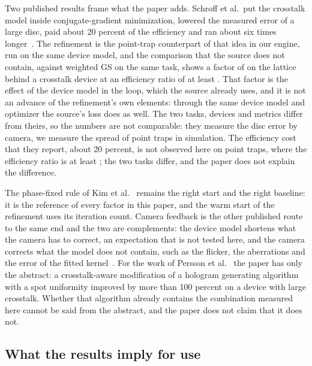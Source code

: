 Two published results frame what the paper adds. Schroff et al.\ put the crosstalk model inside conjugate-gradient minimization, lowered the measured error of a large disc, paid about 20 percent of the efficiency and ran about six times longer~\cite{schroff}. The refinement is the point-trap counterpart of that idea in our engine, run on the same device model, and the comparison that the source does not contain, against weighted GS on the same task, shows a factor of \ratioOneGm{} on the lattice behind a crosstalk device at an efficiency ratio of at least \effRatioOneMin{}. That factor is the effect of the device model in the loop, which the source already uses, and it is not an advance of the refinement's own elements: through the same device model and optimizer the source's loss does as well. The two tasks, devices and metrics differ from theirs, so the numbers are not comparable: they measure the disc error by camera, we measure the spread of point traps in simulation. The efficiency cost that they report, about 20 percent, is not observed here on point traps, where the efficiency ratio is at least \effRatioOneMin{}; the two tasks differ, and the paper does not explain the difference.

The phase-fixed rule of Kim et al.~\cite{kim2019} remains the right start and the right baseline: it is the reference of every factor in this paper, and the warm start of the refinement uses its iteration count. Camera feedback is the other published route to the same end and the two are complements: the device model shortens what the camera has to correct, an expectation that is not tested here, and the camera corrects what the model does not contain, such as the flicker, the aberrations and the error of the fitted kernel~\cite{nogrette,schroff}. For the work of Persson et al.~\cite{persson} the paper has only the abstract: a crosstalk-aware modification of a hologram generating algorithm with a spot uniformity improved by more than 100 percent on a device with large crosstalk. Whether that algorithm already contains the combination measured here cannot be said from the abstract, and the paper does not claim that it does not.

\subsection{What the results imply for use}

